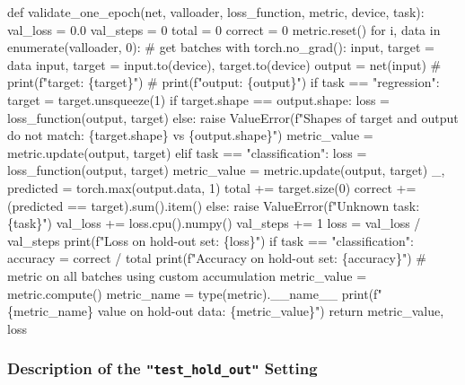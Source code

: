 \documentclass[
  letterpaper,
  DIV=11,
  numbers=noendperiod]{scrreprt}
\newenvironment{Shaded}{\begin{snugshade}}{\end{snugshade}}
\newcommand{\NormalTok}[1]{\textcolor[rgb]{0.00,0.23,0.31}{#1}}
\begin{document}
\begin{Shaded}
\begin{Highlighting}[]
\NormalTok{def validate\_one\_epoch(net, valloader, loss\_function, metric, device, task):}
\NormalTok{    val\_loss = 0.0}
\NormalTok{    val\_steps = 0}
\NormalTok{    total = 0}
\NormalTok{    correct = 0}
\NormalTok{    metric.reset()}
\NormalTok{    for i, data in enumerate(valloader, 0):}
\NormalTok{        \# get batches}
\NormalTok{        with torch.no\_grad():}
\NormalTok{            input, target = data}
\NormalTok{            input, target = input.to(device), target.to(device)}
\NormalTok{            output = net(input)}
\NormalTok{            \# print(f"target: \{target\}")}
\NormalTok{            \# print(f"output: \{output\}")}
\NormalTok{            if task == "regression":}
\NormalTok{                target = target.unsqueeze(1)}
\NormalTok{                if target.shape == output.shape:}
\NormalTok{                    loss = loss\_function(output, target)}
\NormalTok{                else:}
\NormalTok{                    raise ValueError(f"Shapes of target and output }
\NormalTok{                        do not match: \{target.shape\} vs \{output.shape\}")}
\NormalTok{                metric\_value = metric.update(output, target)}
\NormalTok{            elif task == "classification":}
\NormalTok{                loss = loss\_function(output, target)}
\NormalTok{                metric\_value = metric.update(output, target)}
\NormalTok{                \_, predicted = torch.max(output.data, 1)}
\NormalTok{                total += target.size(0)}
\NormalTok{                correct += (predicted == target).sum().item()}
\NormalTok{            else:}
\NormalTok{                raise ValueError(f"Unknown task: \{task\}")}
\NormalTok{            val\_loss += loss.cpu().numpy()}
\NormalTok{            val\_steps += 1}
\NormalTok{    loss = val\_loss / val\_steps}
\NormalTok{    print(f"Loss on hold{-}out set: \{loss\}")}
\NormalTok{    if task == "classification":}
\NormalTok{        accuracy = correct / total}
\NormalTok{        print(f"Accuracy on hold{-}out set: \{accuracy\}")}
\NormalTok{    \# metric on all batches using custom accumulation}
\NormalTok{    metric\_value = metric.compute()}
\NormalTok{    metric\_name = type(metric).\_\_name\_\_}
\NormalTok{    print(f"\{metric\_name\} value on hold{-}out data: \{metric\_value\}")}
\NormalTok{    return metric\_value, loss}
\end{Highlighting}
\end{Shaded}

\hypertarget{description-of-the-test_hold_out-setting}{%
\subsubsection{\texorpdfstring{Description of the
\texttt{"test\_hold\_out"}
Setting}{Description of the "test\_hold\_out" Setting}}\label{description-of-the-test_hold_out-setting}}
\end{document}

